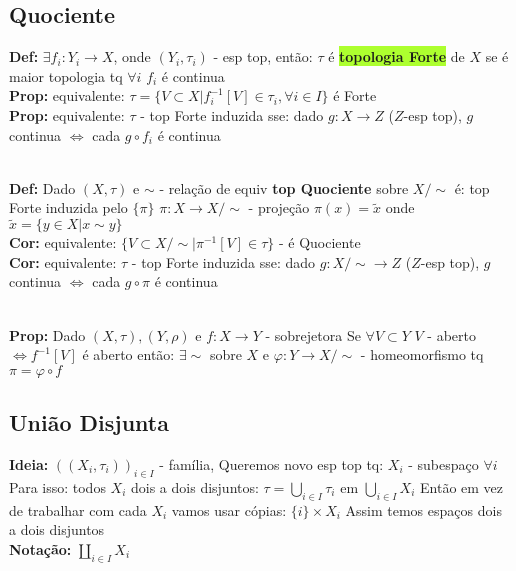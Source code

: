 \documentclass{article}
\begin{document}
\begin{landscape}
\begin{multicols}{3}
\subsection{Quociente}

\textbf{Def:} $\exists f_i:Y_i\to X$, onde $(Y_i,\tau_i)$ - esp top, então: 
$\tau$ é \colorbox{GreenYellow}{\textbf{topologia Forte}} de $X$ se é maior topologia tq $\forall i$ $f_i$ é continua\\
\textbf{Prop:} equivalente: $\tau=\{V\subset X|f_i^{-1}[V]\in \tau_i,\forall i\in I\}$ é Forte\\
\textbf{Prop:} equivalente: $\tau$ - top Forte induzida sse: 
dado $g:X\to Z$ ($Z$-esp top), $g$ continua $\Leftrightarrow$ cada $g\circ f_i$ é continua\\
\\
\textbf{Def:} Dado $(X,\tau)$ e $\sim$ - relação de equiv
\textbf{top Quociente} sobre $X/\sim$ é:
top Forte induzida pelo $\{\pi\}$ $\pi:X\to X/\sim$ - projeção $\pi(x)=\tilde{x}$ onde $\tilde{x}=\{y\in X|x\sim y\}$\\
\textbf{Cor:} equivalente: $\{V\subset X/\sim| \pi^{-1}[V]\in \tau\}$ - é Quociente\\
\textbf{Cor:} equivalente: $\tau$ - top Forte induzida sse:
dado $g:X/\sim\to Z$ ($Z$-esp top), $g$ continua $\Leftrightarrow$ cada $g\circ \pi$ é continua\\
\\
\textbf{Prop:} Dado $(X,\tau),(Y,\rho)$ e $f:X\to Y$ - sobrejetora 
Se $\forall V\subset Y$ $V$ - aberto $\Leftrightarrow f^{-1}[V]$ é aberto então: 
$\exists \sim$ sobre $X$ e $\varphi:Y\to X/\sim$ - homeomorfismo tq $\pi=\varphi\circ f$\\
\subsection{União Disjunta}
\textbf{Ideia:} $((X_i,\tau_i))_{i\in I}$ - família,
Queremos novo esp top tq: $X_i$ - subespaço $\forall i$ 
Para isso: todos $X_i$ dois a dois disjuntos: $\tau = \bigcup_{i\in I}\tau_i$ em $\bigcup_{i\in I} X_i$ 
Então em vez de trabalhar com cada $X_i$ vamos usar cópias: $\{i\}\times X_i$ 
Assim temos espaços dois a dois disjuntos\\
\textbf{Notação:} $\coprod_{i\in I}X_i$
\end{multicols}
\begin{center}

\end{center}
\end{landscape}
\end{document}

